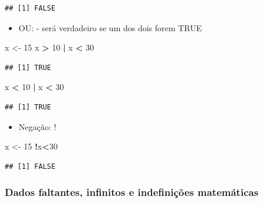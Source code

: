 \documentclass[
]{book}
\newenvironment{Shaded}{\begin{snugshade}}{\end{snugshade}}
\newcommand{\DecValTok}[1]{\textcolor[rgb]{0.00,0.00,0.81}{#1}}
\newcommand{\NormalTok}[1]{#1}
\newcommand{\OperatorTok}[1]{\textcolor[rgb]{0.81,0.36,0.00}{\textbf{#1}}}
\newcommand{\StringTok}[1]{\textcolor[rgb]{0.31,0.60,0.02}{#1}}
\providecommand{\tightlist}{%
  \setlength{\itemsep}{0pt}\setlength{\parskip}{0pt}}
\begin{document}
\begin{verbatim}
## [1] FALSE
\end{verbatim}

\begin{itemize}
\tightlist
\item
  OU: \textbar{} - será verdadeiro se um dos dois forem TRUE
\end{itemize}

\begin{Shaded}
\begin{Highlighting}[]
\NormalTok{x <-}\StringTok{ }\DecValTok{15}
\NormalTok{x }\OperatorTok{>}\StringTok{ }\DecValTok{10} \OperatorTok{|}\StringTok{ }\NormalTok{x }\OperatorTok{<}\StringTok{ }\DecValTok{30}
\end{Highlighting}
\end{Shaded}

\begin{verbatim}
## [1] TRUE
\end{verbatim}

\begin{Shaded}
\begin{Highlighting}[]
\NormalTok{x }\OperatorTok{<}\StringTok{ }\DecValTok{10} \OperatorTok{|}\StringTok{ }\NormalTok{x }\OperatorTok{<}\StringTok{ }\DecValTok{30}
\end{Highlighting}
\end{Shaded}

\begin{verbatim}
## [1] TRUE
\end{verbatim}

\begin{itemize}
\tightlist
\item
  Negação: !
\end{itemize}

\begin{Shaded}
\begin{Highlighting}[]
\NormalTok{x <-}\StringTok{ }\DecValTok{15}
\OperatorTok{!}\NormalTok{x}\OperatorTok{<}\DecValTok{30}
\end{Highlighting}
\end{Shaded}

\begin{verbatim}
## [1] FALSE
\end{verbatim}

\hypertarget{dados-faltantes-infinitos-e-indefiniuxe7uxf5es-matemuxe1ticas}{%
\subsubsection{Dados faltantes, infinitos e indefinições matemáticas}\label{dados-faltantes-infinitos-e-indefiniuxe7uxf5es-matemuxe1ticas}}
\end{document}
